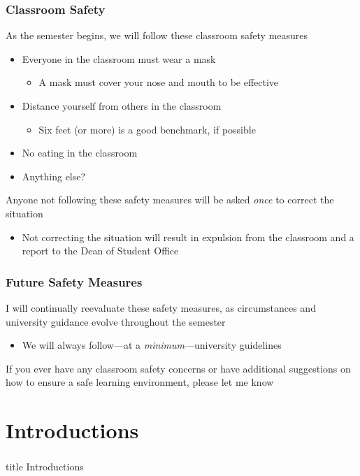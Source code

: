 \documentclass{beamer}
\begin{document}
\begin{frame}\frametitle{Classroom Safety}
    As the semester begins, we will follow these classroom safety measures
    \begin{itemize}
        \item Everyone in the classroom must wear a mask
        \begin{itemize}
            \item A mask must cover your nose and mouth to be effective
        \end{itemize}
        \item Distance yourself from others in the classroom
        \begin{itemize}
            \item Six feet (or more) is a good benchmark, if possible
        \end{itemize}
        \item No eating in the classroom
        \item Anything else?
    \end{itemize}
    \vspace{3ex}
    Anyone not following these safety measures will be asked \emph{once} to correct the situation
    \begin{itemize}
        \item Not correcting the situation will result in expulsion from the classroom and a report to the Dean of Student Office
    \end{itemize}
\end{frame}

\begin{frame}\frametitle{Future Safety Measures}
    I will continually reevaluate these safety measures, as circumstances and university guidance evolve throughout the semester
    \begin{itemize}
        \item We will always follow---at a \emph{minimum}---university guidelines
    \end{itemize}
    \vspace{6ex}
    If you ever have any classroom safety concerns or have additional suggestions on how to ensure a safe learning environment, please let me know
\end{frame}

\section{Introductions}
\label{introductions}
\begin{frame}\frametitle{}
    \vfill
    \centering
    \begin{beamercolorbox}[center]{title}
        \Large Introductions
    \end{beamercolorbox}
    \vfill
\end{frame}
\end{document}
